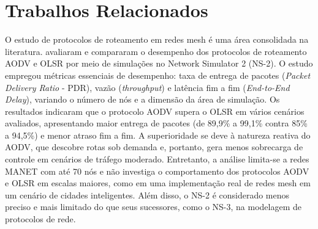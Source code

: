 \documentclass[12pt]{article}
\begin{document}


\section{Trabalhos Relacionados}\label{sec:related}

O estudo de protocolos de roteamento em redes mesh é uma área consolidada na literatura. \cite{jubair2018} avaliaram e compararam o desempenho dos protocolos de roteamento AODV e OLSR por meio de simulações no Network Simulator 2 (NS-2). O estudo empregou métricas essenciais de desempenho: taxa de entrega de pacotes (\textit{Packet Delivery Ratio} - PDR), vazão (\textit{throughput}) e latência fim a fim (\textit{End-to-End Delay}), variando o número de nós e a dimensão da área de simulação. Os resultados indicaram que o protocolo AODV supera o OLSR em vários cenários avaliados, apresentando maior entrega de pacotes (de 89,9\% a 99,1\% contra 85\% a 94,5\%) e menor atraso fim a fim. A superioridade se deve à natureza reativa do AODV, que descobre rotas sob demanda e, portanto, gera menos sobrecarga de controle em cenários de tráfego moderado. Entretanto, a análise limita-se a redes MANET com até 70 nós e não investiga o comportamento dos protocolos AODV e OLSR em escalas maiores, como em uma implementação real de redes mesh em um cenário de cidades inteligentes. Além disso, o NS-2 é considerado menos preciso e mais limitado do que seus sucessores, como o NS-3, na modelagem de protocolos de rede.
\end{document}
